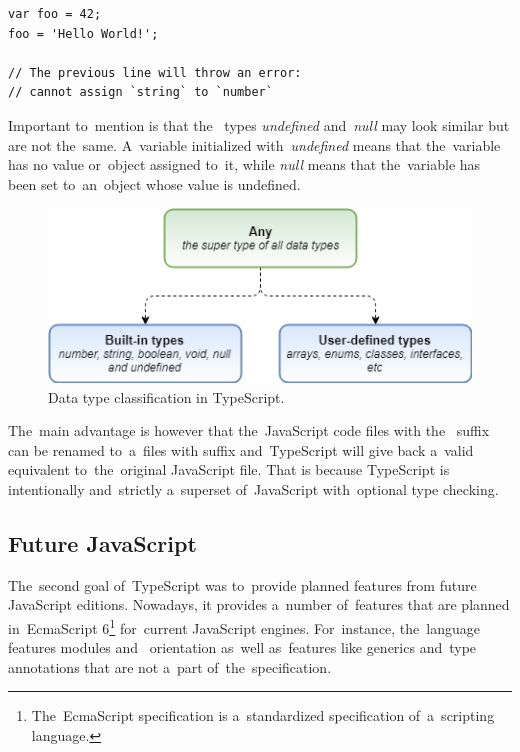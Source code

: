 \pagebreak
\begin{lstlisting}[caption=An~example of~TypeScript's type inference. The~type
of~the~variable is inferred by~the~TypeScript Language Service based on~its
value.,
label=TypeScriptInference,language=HTML]
var foo = 42;
foo = 'Hello World!';

// The previous line will throw an error: 
// cannot assign `string` to `number`
\end{lstlisting}

Important to~mention is that the~ types \textit{undefined}
and~\textit{null} may look similar but are not the~same. A~variable initialized
with~\textit{undefined} means that the~variable has no value or~object assigned
to~it, while \textit{null} means that the~variable has been set to~an~object
whose value is undefined.

\begin{figure}[!hbt]
	\centering
	\includegraphics[scale=0.65]{./obrazky-figures/typescript-types.png}
	\caption{Data type classification in TypeScript.}
	\label{TypeScriptDataTypes}
\end{figure}

The~main advantage is however that the~JavaScript code files with the~
suffix can be renamed to~a~files with  suffix and~TypeScript will give
back a~valid equivalent to~the~original JavaScript file. That is because
TypeScript is intentionally and~strictly a~superset of~JavaScript with~optional type checking.

\subsection{Future JavaScript}
The~second goal of~TypeScript was to~provide planned features from future
JavaScript editions. Nowadays, it provides a~number of~features that are planned
in~EcmaScript 6\footnote{The~EcmaScript specification is a~standardized
specification of~a~scripting language.} for~current JavaScript engines.
For~instance, the~language features modules and~ orientation
as~well as~features like generics and~type annotations that are not a~part
of~the~specification.

